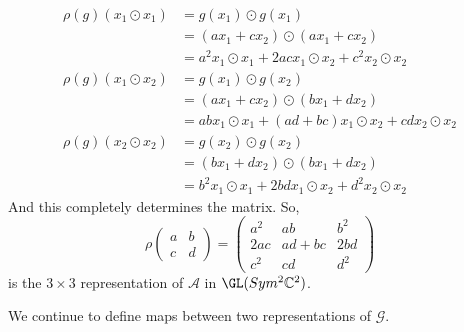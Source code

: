 \begin{example}
\begin{align*}
      \rho(g) (x_1 \odot x_1) & = g(x_1) \odot g(x_1) \\
      & = (a x_1 + c x_2) \odot (a x_1 + c x_2) \\
      & = a^2 x_1 \odot x_1 + 2ac x_1 \odot x_2 + c^2 x_2 \odot x_2 \\
      \rho(g) (x_1 \odot x_2) & = g(x_1) \odot g(x_2) \\
      & = (a x_1 + c x_2) \odot (b x_1 + d x_2) \\
      & = ab x_1 \odot x_1 + (ad + bc) x_1 \odot x_2 + cd x_2 \odot x_2 \\
      \rho(g) (x_2 \odot x_2) & = g(x_2) \odot g(x_2) \\
      & = (b x_1 + d x_2) \odot (b x_1 + d x_2) \\
      & = b^2 x_1 \odot x_1 + 2bd x_1 \odot x_2 + d^2 x_2 \odot x_2
    \end{align*}
    And this completely determines the matrix. So, 
    \begin{equation}
      \rho \begin{pmatrix}
      a&b\\c&d
      \end{pmatrix} = \begin{pmatrix}
      a^2&ab&b^2\\2ac&ad+bc&2bd\\c^2&cd&d^2
      \end{pmatrix}
    \end{equation}
    is the $3 \times 3$ representation of $\mathcal{A}$ in $\GL(Sym^2 \mathbb{C}^2)$. 
  \end{example}

  We continue to define maps between two representations of $\mathcal{G}$. 

